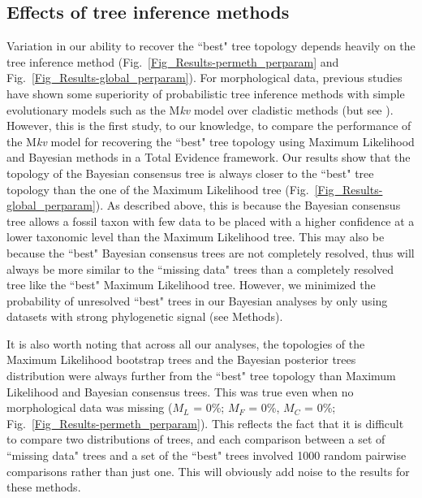 \documentclass[10pt,letterpaper]{article}
\begin{document}
\subsection*{Effects of tree inference methods}
Variation in our ability to recover the ``best" tree topology depends heavily on the tree inference method (Fig.~\ref{Fig_Results-permeth_perparam} and Fig.~\ref{Fig_Results-global_perparam}). For morphological data, previous studies have shown some superiority of probabilistic tree inference methods with simple evolutionary models such as the M\textit{kv} model \cite{lewisa2001} over cladistic methods \cite{wrightbayesian2014} (but see \cite{spencerefficacy2013}). However, this is the first study, to our knowledge, to compare the performance of the M\textit{kv} model \cite{lewisa2001} for recovering the ``best" tree topology using Maximum Likelihood and Bayesian methods in a Total Evidence framework. Our results show that the topology of the Bayesian consensus tree is always closer to the ``best" tree topology than the one of the Maximum Likelihood tree (Fig.~\ref{Fig_Results-global_perparam}). As described above, this is because the Bayesian consensus tree allows a fossil taxon with few data to be placed with a higher confidence at a lower taxonomic level than the Maximum Likelihood tree. This may also be because the ``best" Bayesian consensus trees are not completely resolved, thus will always be more similar to the ``missing data" trees than a completely resolved tree like the ``best" Maximum Likelihood tree. However, we minimized the probability of unresolved ``best" trees in our Bayesian analyses by only using datasets with strong phylogenetic signal (see Methods).

It is also worth noting that across all our analyses, the topologies of the Maximum Likelihood bootstrap trees and the Bayesian posterior trees distribution were always further from the ``best" tree topology than Maximum Likelihood and Bayesian consensus trees. This was true even when no morphological data was missing ($M_{L}$ = 0\%; $M_{F}$ = 0\%, $M_{C}$ = 0\%; Fig.~\ref{Fig_Results-permeth_perparam}). This reflects the fact that it is difficult to compare two distributions of trees, and each comparison between a set of ``missing data" trees and a set of the ``best" trees involved 1000 random pairwise comparisons rather than just one. This will obviously add noise to the results for these methods.
\end{document}
